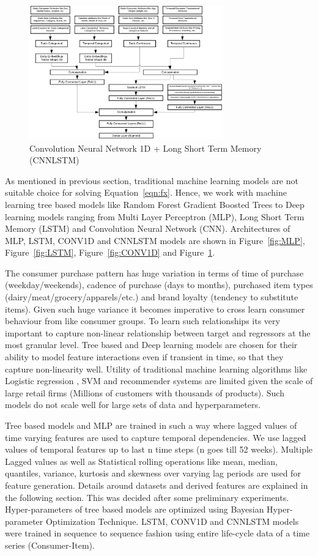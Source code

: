   \begin{figure}[t]
    \centering 
    \includegraphics[width=3.3in]{img/CNNLSTM.png} 
    \caption{Convolution Neural Network 1D + Long Short Term Memory (CNNLSTM)} 
    \label{fig:CNNLSTM} 
  \end{figure}

As mentioned in previous section, traditional machine learning models are not suitable choice for solving Equation~\ref{eqn:fx}. 
Hence, we work with machine learning tree based models like Random Forest Gradient Boosted Trees 
to Deep learning models ranging from Multi Layer Perceptron (MLP), Long Short 
Term Memory (LSTM) and Convolution Neural Network (CNN). Architectures of MLP, LSTM, CONV1D and CNNLSTM 
models are shown in Figure~\ref{fig:MLP}, Figure~\ref{fig:LSTM}, Figure~\ref{fig:CONV1D}
and Figure~\ref{fig:CNNLSTM}.

The consumer purchase pattern has huge variation in terms of time of purchase (weekday/weekends), 
cadence of purchase (days to months), purchased item types (dairy/meat/grocery/apparels/etc.)
and brand loyalty (tendency to substitute items). Given such huge variance it becomes imperative 
to cross learn consumer behaviour from like consumer groups. To learn such relationships its very 
important to capture non-linear relationship between target and regressors at the most granular level.
Tree based and Deep learning models are chosen for their ability to model feature interactions even if transient in time, 
so that they capture non-linearity well. Utility of traditional machine learning algorithms like Logistic regression
, SVM and recommender systems are limited given the scale of large retail firms 
(Millions of customers with thousands of products). Such models do not scale well for large sets of data and hyperparameters.

Tree based models and MLP are trained in such a way where lagged values of time varying features are used
to capture temporal dependencies. We use lagged values of temporal features up to last n time steps (n goes till 52 weeks).
Multiple Lagged values as well as Statistical rolling operations like mean, median, quantiles, variance, kurtosis and 
skewness over varying lag periods are used for feature generation. Details around datasets and derived features are explained 
in the following section. This was decided after some preliminary experiments. Hyper-parameters of tree based models are optimized
using Bayesian Hyper-parameter Optimization Technique. LSTM, CONV1D and CNNLSTM models were trained in sequence to sequence 
fashion using entire life-cycle data of a time series (Consumer-Item).

